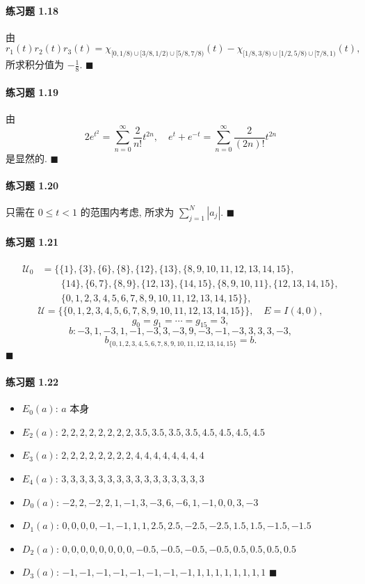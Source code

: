 \paragraph*{练习题 1.18}
由
\[
r_{1}(t)r_{2}(t)r_{3}(t) = \chi_{[0,1/8)\cup[3/8,1/2)\cup[5/8,7/8)}(t) - \chi_{[1/8,3/8)\cup[1/2,5/8)\cup[7/8,1)}(t),
\]
所求积分值为 $-\frac{1}{8}$. $\blacksquare$

\paragraph*{练习题 1.19}
由
\[
2e^{t^{2}} = \sum_{n=0}^{\infty}\frac{2}{n!}t^{2n}, \quad e^{t}+e^{-t} = \sum_{n=0}^{\infty}\frac{2}{(2n)!}t^{2n}
\]
是显然的. $\blacksquare$

\paragraph*{练习题 1.20}
只需在 $0 \leq t < 1$ 的范围内考虑, 所求为 $\sum_{j=1}^{N}|a_{j}|$. $\blacksquare$

\paragraph*{练习题 1.21}
\begin{align*}
\mathcal{U}_{0} &= \{\{1\}, \{3\}, \{6\}, \{8\}, \{12\}, \{13\}, \{8,9,10,11,12,13,14,15\}, \\
&\qquad \{14\}, \{6,7\}, \{8,9\}, \{12,13\}, \{14,15\}, \{8,9,10,11\}, \{12,13,14,15\}, \\
&\qquad \{0,1,2,3,4,5,6,7,8,9,10,11,12,13,14,15\}\},
\end{align*}
\[
\mathcal{U} = \{\{0,1,2,3,4,5,6,7,8,9,10,11,12,13,14,15\}\}, \quad E = I(4,0),
\]
\[
g_{0} = g_{1} = \cdots = g_{15} = 3,
\]
\[
b: -3, 1, -3, 1, -1, -3, 3, -3, 9, -3, -1, -3, 3, 3, 3, -3,
\]
\[
b_{\{0,1,2,3,4,5,6,7,8,9,10,11,12,13,14,15\}} = b.
\]
$\blacksquare$

\paragraph*{练习题 1.22}
\begin{itemize}
\item $E_{0}(a)$: $a$ 本身
\item $E_{2}(a)$: $2, 2, 2, 2, 2, 2, 2, 2, 3.5, 3.5, 3.5, 3.5, 4.5, 4.5, 4.5, 4.5$
\item $E_{3}(a)$: $2, 2, 2, 2, 2, 2, 2, 2, 4, 4, 4, 4, 4, 4, 4, 4$
\item $E_{4}(a)$: $3, 3, 3, 3, 3, 3, 3, 3, 3, 3, 3, 3, 3, 3, 3, 3$
\item $D_{0}(a)$: $-2, 2, -2, 2, 1, -1, 3, -3, 6, -6, 1, -1, 0, 0, 3, -3$
\item $D_{1}(a)$: $0, 0, 0, 0, -1, -1, 1, 1, 2.5, 2.5, -2.5, -2.5, 1.5, 1.5, -1.5, -1.5$
\item $D_{2}(a)$: $0, 0, 0, 0, 0, 0, 0, 0, -0.5, -0.5, -0.5, -0.5, 0.5, 0.5, 0.5, 0.5$
\item $D_{3}(a)$: $-1, -1, -1, -1, -1, -1, -1, -1, 1, 1, 1, 1, 1, 1, 1, 1$ $\blacksquare$
\end{itemize}

